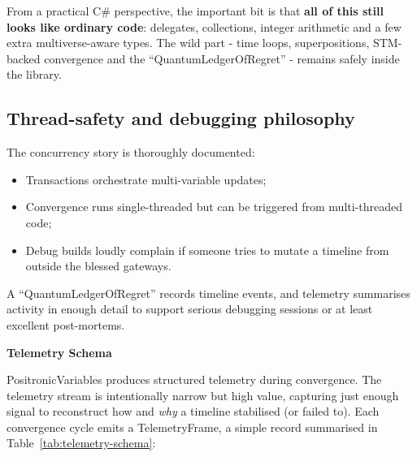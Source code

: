\documentclass[a4paper,11pt]{article}
\begin{document}
From a practical C\# perspective, the important bit is that \textbf{all of this still looks like ordinary code}: delegates, collections, integer arithmetic and a few extra multiverse-aware types. The wild part - time loops, superpositions, STM-backed convergence and the ``QuantumLedgerOfRegret'' - remains safely inside the library.

\subsection{Thread-safety and debugging philosophy}

The concurrency story is thoroughly documented:

\begin{itemize}
\item
  Transactions orchestrate multi-variable updates;
\item
  Convergence runs single-threaded but can be triggered from multi-threaded code;
\item
  Debug builds loudly complain if someone tries to mutate a timeline from outside the blessed gateways.
\end{itemize}

A ``QuantumLedgerOfRegret'' records timeline events, and telemetry summarises activity in enough detail to support serious debugging sessions or at least excellent post-mortems.

\textbf{Telemetry Schema}

PositronicVariables produces structured telemetry during convergence. The telemetry stream is intentionally narrow but high value, capturing just enough signal to reconstruct how and \emph{why} a timeline stabilised (or failed to). Each convergence cycle emits a TelemetryFrame, a simple record summarised in Table~\ref{tab:telemetry-schema}:
\end{document}
